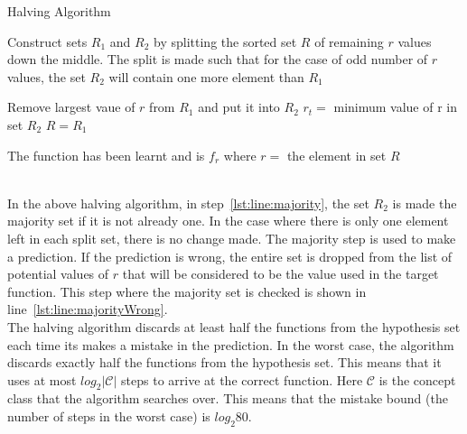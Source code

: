 \begin{enumerate}
\begin{enumerate}
\begin{minipage}{\linewidth}
  \begin{algorithm}[H]
    \caption{Halving Algorithm}\label{MDLA}
    \begin{algorithmic}[1]
	\State  \parbox[t]{\dimexpr\linewidth-\algorithmicindent} {Construct sets $R_1$ and $R_2$ by splitting the sorted set $R$ of remaining $r$ values down the middle. The split is made such that for the case of odd number of $r$ values, the set $R_2$ will contain one more element than $R_1$}
	 \State Remove largest vaue of $r$ from $R_1$ and put it into $R_2$ \label{lst:line:majority}
	\EndIf
	\State $r_t =$ minimum value of r in set $R_2$
	 \label{lst:line:majorityWrong}
	  \State $R = R_1$
	    \State \parbox[t]{\dimexpr\linewidth-\algorithmicindent} {The function has been learnt and is $f_r$ where $r =$ the element in set $R$}
	  \EndIf
	\EndIf
      \EndProcedure
    \end{algorithmic}
  \end{algorithm}
\end{minipage}\\

In the above halving algorithm, in step~\ref{lst:line:majority}, the set $R_2$ is made the majority set if it is not already one. In the case where there is only one element left in each split set, there is no change made. The majority step is used to make a prediction. If the prediction is wrong, the entire set is dropped from the list of potential values of $r$ that will be considered to be the value used in the target function. This step where the majority set is checked is shown in line~\ref{lst:line:majorityWrong}.\\

The halving algorithm discards at least half the functions from the hypothesis set each time its makes a mistake in the prediction. In the worst case, the algorithm discards exactly half the functions from the hypothesis set. This means that it uses at most $log_2 \left | \mathcal{C} \right |$ steps to arrive at the correct function. Here $\mathcal{C}$ is the concept class that the algorithm searches over. This means that the mistake bound (the number of steps in the worst case) is $log_2 80$.
  \end{enumerate}

\end{enumerate}


